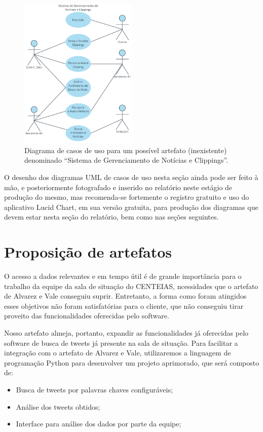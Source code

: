 \documentclass[12pt]{article}
\newcommand{\rascend}{\color{black}}    %
\begin{document}
	\begin{figure}[ht]
		\centering
		\includegraphics[width=0.5\textwidth]{CasodeUsoparaaSaladeSituacao.png}
		\caption{Diagrama de casos de uso para um possível artefato (inexistente) denominado ``Sistema de Gerenciamento de Notícias e Clippings''\label{caso:de:uso}.}		
	\end{figure}
	
	O desenho dos diagramas UML de casos de uso nesta seção ainda pode ser feito à mão, e posteriormente fotografado e inserido no relatório neste estágio de produção do mesmo, mas
	recomenda-se fortemente o registro gratuito e uso do aplicativo Lucid Chart, em sua versão gratuita, para produção dos diagramas que devem estar nesta seção do relatório, bem como nas seções seguintes.
	
	\rascend
	
	\section{Proposição de artefatos\label{Sec:CP:ProposicaoArtefatos}}
    O acesso a dados relevantes e em tempo útil é de grande importância para o trabalho da equipe da sala de situação do CENTEIAS, ncessidades que o artefato de Alvarez e Vale conseguiu suprir. Entretanto, a forma como foram atingidos esses objetivos não foram satisfatórias para o cliente, que não conseguiu tirar proveito das funcionalidades oferecidas pelo software.
    
    Nosso artefato almeja, portanto, expandir as funcionalidades já oferecidas pelo software de busca de tweets já presente na sala de situação. Para facilitar a integração com o artefato de Alvarez e Vale, utilizaremos a linguagem de programação Python para desenvolver um projeto aprimorado, que será composto de:
    \begin{itemize}
        \item Busca de tweets por palavras chaves configuráveis;
        \item Análise dos tweets obtidos;
        \item Interface para análise dos dados por parte da equipe;
    \end{itemize}
    
\end{document}
